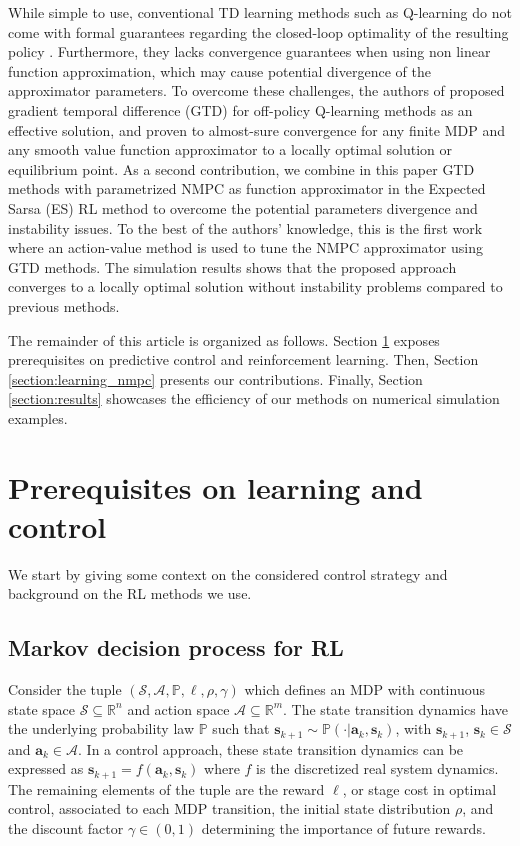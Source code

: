 \documentclass[letterpaper, 10pt, conference]{ieeeconf}
\begin{document}
While simple to use, conventional TD learning methods such as Q-learning do not come with formal guarantees regarding the closed-loop optimality of the resulting policy \cite{sutton2018reinforcement}.
Furthermore, they lacks convergence guarantees when using non linear function approximation, which may cause potential divergence of the approximator parameters.
To overcome these challenges, the authors of \cite{maei2010toward} proposed gradient temporal difference (GTD) for off-policy Q-learning methods as an effective solution, and proven to almost-sure convergence for any finite MDP and any smooth value function approximator to a locally optimal solution or equilibrium point. 
As a second contribution, we combine in this paper GTD methods with parametrized NMPC as function approximator in the Expected Sarsa (ES) RL method to overcome the potential parameters divergence and instability issues.
To the best of the authors' knowledge, this is the first work where an action-value method is used to tune the NMPC approximator using GTD methods. 
The simulation results shows that the proposed approach converges to a locally optimal solution without instability problems compared to previous methods.

The remainder of this article is organized as follows.
Section \ref{section:prerequisites} exposes prerequisites on predictive control and reinforcement learning.
Then, Section \ref{section:learning_nmpc} presents our contributions. 
Finally, Section \ref{section:results} showcases the efficiency of our methods on numerical simulation examples.

\section{Prerequisites on learning and control}
	\label{section:prerequisites}

We start by giving some context on the considered control strategy and background on the RL methods we use.

	\subsection{Markov decision process for RL}
		\label{subsection:MDP}

Consider the tuple $(\mathcal{S}, \mathcal{A}, \mathbb{P}, \ell, \rho, \gamma)$ which defines an MDP with continuous state space $\mathcal{S}\subseteq\mathbb{R}^n$ and action space $\mathcal{A}\subseteq\mathbb{R}^m$.
The state transition dynamics have the underlying probability law $\mathbb{P}$ such that $\mathbf{s}_{k + 1} \sim \mathbb{P}(\cdot|\mathbf{a}_k, \mathbf{s}_k)$, with $\mathbf{s}_{k + 1}$, $\mathbf{s}_k\in\mathcal{S}$ and $\mathbf{a}_k\in\mathcal{A}$.
In a control approach, these state transition dynamics can be expressed as $\mathbf{s}_{k + 1} = f(\mathbf{a}_k, \mathbf{s}_k)$ where $f$ is the discretized real system dynamics.
The remaining elements of the tuple are the reward $\ell$, or stage cost in optimal control, associated to each MDP transition, the initial state distribution $\rho$, and the discount factor $\gamma\in(0, 1)$ determining the importance of future rewards.
\end{document}
